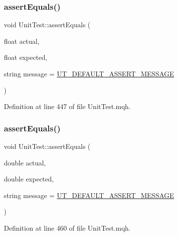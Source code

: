 \subsubsection{\texorpdfstring{assert\+Equals()}{assertEquals()}\hspace{0.1cm}{\footnotesize\ttfamily [10/28]}}
{\footnotesize\ttfamily void Unit\+Test\+::assert\+Equals (\begin{DoxyParamCaption}\item[{float}]{actual,  }\item[{float}]{expected,  }\item[{string}]{message = {\ttfamily \mbox{\hyperlink{_unit_test_8mqh_a96f5d62188d09039ebc3f443c9120e39}{U\+T\+\_\+\+D\+E\+F\+A\+U\+L\+T\+\_\+\+A\+S\+S\+E\+R\+T\+\_\+\+M\+E\+S\+S\+A\+GE}}} }\end{DoxyParamCaption})}



Definition at line 447 of file Unit\+Test.\+mqh.

\mbox{\label{class_unit_test_aeea8f3644d850c0a15c9b14da38fc846}} 
\subsubsection{\texorpdfstring{assert\+Equals()}{assertEquals()}\hspace{0.1cm}{\footnotesize\ttfamily [11/28]}}
{\footnotesize\ttfamily void Unit\+Test\+::assert\+Equals (\begin{DoxyParamCaption}\item[{double}]{actual,  }\item[{double}]{expected,  }\item[{string}]{message = {\ttfamily \mbox{\hyperlink{_unit_test_8mqh_a96f5d62188d09039ebc3f443c9120e39}{U\+T\+\_\+\+D\+E\+F\+A\+U\+L\+T\+\_\+\+A\+S\+S\+E\+R\+T\+\_\+\+M\+E\+S\+S\+A\+GE}}} }\end{DoxyParamCaption})}



Definition at line 460 of file Unit\+Test.\+mqh.

\mbox{\label{class_unit_test_a28ee30fb3e909e3cf02cff8c0f781ad0}} 
